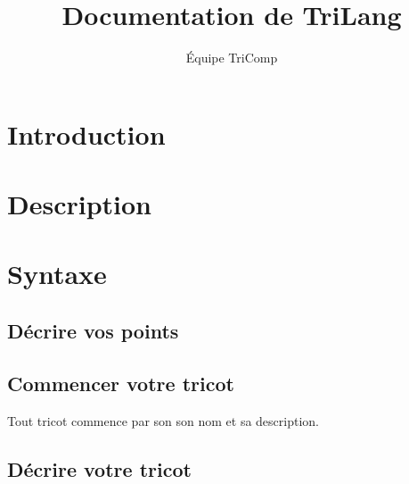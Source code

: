 \documentclass[a4paper,10pt]{article}
\title{Documentation de TriLang}
\author{Équipe TriComp}
\begin{document}
\maketitle

\begin{abstract}

\end{abstract}

\newpage

\tableofcontents

\newpage


\section{Introduction}

\section{Description}


\section{Syntaxe}

  \subsection{Décrire vos points}

  
  \subsection{Commencer votre tricot}
  
Tout tricot commence par son son nom et sa description. 
  
  \subsection{Décrire votre tricot}



  

\appendix
\end{document}
